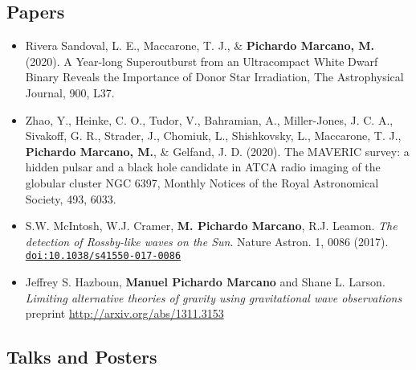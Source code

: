 \documentclass[letterpaper,10pt]{article}
\begin{document}
\subsection*{Papers}
\begin{itemize}[label=$\blacktriangleright$]

    \item Rivera Sandoval, L. E., Maccarone, T. J., \& \textbf{Pichardo Marcano, M.} (2020). A Year-long Superoutburst from an Ultracompact White Dwarf Binary Reveals the Importance of Donor Star Irradiation, The Astrophysical Journal, 900, L37. \\

    \item Zhao, Y., Heinke, C. O., Tudor, V., Bahramian, A., Miller-Jones, J. C. A., Sivakoff, G. R., Strader, J., Chomiuk, L., Shishkovsky, L., Maccarone, T. J., \textbf{Pichardo Marcano, M.}, \& Gelfand, J. D. (2020). The MAVERIC survey: a hidden pulsar and a black hole candidate in ATCA radio imaging of the globular cluster NGC 6397, Monthly Notices of the Royal Astronomical Society, 493, 6033. \href{10.1093/mnras/staa631} \\


\item  S.W. McIntosh, W.J. Cramer, \textbf{M. Pichardo Marcano}, R.J. Leamon. \emph{The detection of Rossby-like waves on the Sun}. Nature Astron. 1, 0086 (2017). \href{http://dx.doi.org/10.1038/s41550-017-0086}{\tt doi:10.1038/s41550-017-0086} \\


\item  Jeffrey S. Hazboun, \textbf{Manuel Pichardo Marcano} and Shane L. Larson. \emph{Limiting alternative theories of gravity using gravitational wave observations} \\
 preprint \url{http://arxiv.org/abs/1311.3153} \\


\end{itemize}

\subsection*{Talks and Posters}
\end{document}
